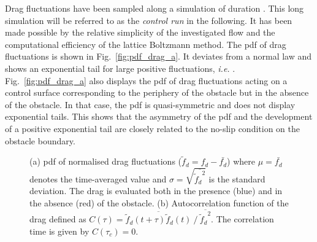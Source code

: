 \documentclass{jfm}
\newcommand{\EL}[1]{{\color{myred}{#1}}}
\newcommand{\QQ}[1]{{\color{green}{#1}}}
\begin{document}
Drag fluctuations have been sampled along a simulation of duration \EL{$T_{tot} = 4\times 10^6~T_0$}.
This long simulation will be referred to as the \textit{control run} in the following.
It has been made possible by the relative simplicity of the investigated flow and the computational efficiency of the lattice Boltzmann method. 
The \ac{pdf} of drag fluctuations is shown in Fig.~\ref{fig:pdf_drag_a}.
It deviates from a normal law and shows an exponential tail for large positive fluctuations, \textit{i.e.}  \EL{${\mathbb{P}}(f_d) \propto e^{-\ell f_d}$}.
%
Fig.~\ref{fig:pdf_drag_a} also displays the \ac{pdf} of drag fluctuations acting on a control surface corresponding to the periphery of the obstacle but in the absence of the obstacle. 
%
In that case, the \ac{pdf} is quasi-symmetric and does not display exponential tails. This shows that the asymmetry of the \ac{pdf} and the development of a positive exponential tail are closely related to the no-slip condition on the obstacle boundary.
\begin{figure}
	\centering
	\caption{{(a)} \ac{pdf} of normalised drag fluctuations ($\tilde f_d = f_d - \bar{f_d}$) where $\mu = \bar{f_d}$ denotes the time-averaged value and $\sigma = \sqrt{\overline{{\tilde f_d}^2}}$ is the standard deviation. The drag is evaluated both in the presence (blue) and in the absence (red) of the obstacle. %
		\QQ{x-axis should be $x = (f_d-\mu)/\sigma)$ and y-axis $P(x)$)}
		{(b)} Autocorrelation function of the drag defined as $C(\tau) = \overline{ \tilde f_d(t+\tau)\tilde f_d(t)} ~/~ \overline{{\tilde f_d}^2}$. The correlation time \EL{$\tau_c\simeq 4 T_0$} is given by $C(\tau_c)=0$.
	}
	\label{fig:pdf_drag}
\end{figure}
\end{document}
